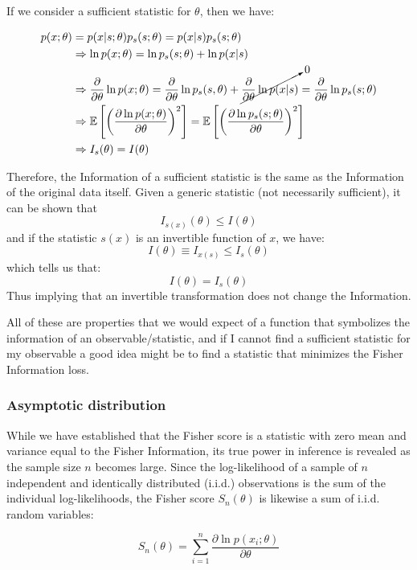 If we consider a sufficient statistic for $\theta$, then we have:

\begin{align*}
	p(x;\theta)&=p(x|s;\theta)p_s(s;\theta)=p(x|s)p_s(s;\theta) \\ &\Rightarrow \ln p(x;\theta) = \ln p_s (s;\theta) + \ln p(x|s) \\
	&\Rightarrow \frac{\partial}{\partial \theta}\ln p(x;\theta) = \frac{\partial}{\partial\theta}\ln p_s(s,\theta) + \cancelto{0}{\frac{\partial}{\partial \theta}\ln p(x|s)} = \frac{\partial}{\partial\theta}\ln p_s(s;\theta)\\
	&\Rightarrow \mathbb{E}\left[\left(\frac{\partial\ln p(x;\theta)}{\partial\theta}\right)^2\right] = \mathbb{E}\left[\left(\frac{\partial\ln p_s(s;\theta)}{\partial\theta}\right)^2\right]\\
	&\Rightarrow I_s(\theta) = I(\theta)
\end{align*}

Therefore, the Information of a sufficient statistic is the same as the Information of the original data itself. Given a generic statistic (not necessarily sufficient), it can be shown that
	\[
	I_{s(x)}(\theta)\leq I(\theta)
	\]
and if the statistic $s(x)$ is an invertible function of $x$, we have:
	\[
	I(\theta)\equiv I_{x(s)}\leq I_s(\theta)
	\]
which tells us that:
	\[
	I(\theta) = I_s(\theta)
	\]
Thus implying that an invertible transformation does not change the Information.

All of these are properties that we would expect of a function that symbolizes the information of an observable/statistic, and if I cannot find a sufficient statistic for my observable a good idea might be to find a statistic that minimizes the Fisher Information loss.

\subsubsection{Asymptotic distribution}

While we have established that the Fisher score is a statistic with zero mean and variance equal to the Fisher Information, its true power in inference is revealed as the sample size $n$ becomes large. Since the log-likelihood of a sample of $n$ independent and identically distributed (i.i.d.) observations is the sum of the individual log-likelihoods, the Fisher score $S_n(\theta)$ is likewise a sum of i.i.d. random variables:

	\[
	S_n(\theta) = \sum_{i=1}^n \frac{\partial \ln p(x_i; \theta)}{\partial \theta}
	\]

